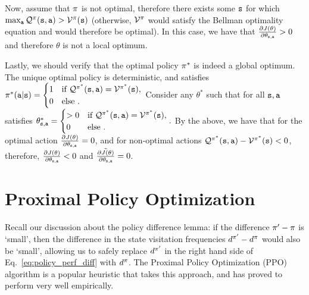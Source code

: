Now, assume that $\pi$ is not optimal, therefore there exists some ${\tt s}$ for which $\max_{{\tt a}} \mathcal{Q}^{\pi}({\tt s},{\tt a}) > \mathcal{V}^{\pi}({\tt s})$ (otherwise, $\mathcal{V}^{\pi}$ would satisfy the Bellman optimality equation and would therefore be optimal). In this case, we have that $\frac{\partial J(\theta)}{\partial \theta_{{\tt s},{\tt a}}} > 0$ and therefore $\theta$ is not a local optimum.

Lastly, we should verify that the optimal policy $\pi^*$ is indeed a global optimum. The unique optimal policy is deterministic, and satisfies $\pi^*({\tt a}|{\tt s}) = \begin{cases}
        1 & \text{if } \mathcal{Q}^{\pi^*}({\tt s},{\tt a}) = \mathcal{V}^{\pi^*}({\tt s}), \\
0 & \text{else }.
\end{cases}$
Consider any $\theta^*$ such that for all ${\tt s},{\tt a}$ satisfies $\theta^*_{{\tt s},{\tt a}} = \begin{cases}
        >0 & \text{if } \mathcal{Q}^{\pi^*}({\tt s},{\tt a}) = \mathcal{V}^{\pi^*}({\tt s}), \\
0 & \text{else }.
\end{cases}.$ By the above, we have that for the optimal action $\frac{\partial J(\theta)}{\partial \theta_{{\tt s},{\tt a}}} = 0$, and for non-optimal actions $\mathcal{Q}^{\pi^*}({\tt s},{\tt a}) - \mathcal{V}^{\pi^*}({\tt s}) < 0$, therefore, $\frac{\partial J(\theta)}{\partial \theta_{{\tt s},{\tt a}}} < 0$ and $\tilde{\frac{\partial J(\theta)}{\partial \theta_{{\tt s},{\tt a}}}} = 0$.

\section{Proximal Policy Optimization}

Recall our discussion about the policy difference lemma: if the difference $\pi' - \pi$ is `small', then the difference in the state visitation frequencies $d^{\pi'} - d^{\pi}$ would also be `small', allowing us to safely replace $d^{\pi'}$ in the right hand side of Eq.~\ref{eq:policy_perf_diff} with $d^{\pi}$. The Proximal Policy Optimization (PPO) algorithm is a popular heuristic that takes this approach, and has proved to perform very well empirically.


